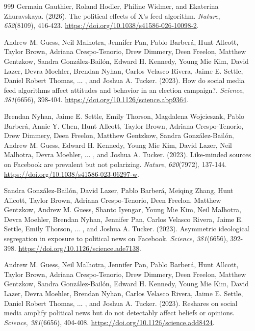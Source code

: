 \documentclass[10pt,a4paper]{article}
\begin{document}
\begin{thebibliography}{999}
Germain Gauthier, Roland Hodler, Philine Widmer, and Ekaterina Zhuravskaya. (2026). The political effects of X's feed algorithm. \textit{Nature}, \textit{652}(8109), 416-423. \url{https://doi.org/10.1038/s41586-026-10098-2}.

Andrew M. Guess, Neil Malhotra, Jennifer Pan, Pablo Barber\'{a}, Hunt Allcott, Taylor Brown, Adriana Crespo-Tenorio, Drew Dimmery, Deen Freelon, Matthew Gentzkow, Sandra Gonz\'{a}lez-Bail\'{o}n, Edward H. Kennedy, Young Mie Kim, David Lazer, Devra Moehler, Brendan Nyhan, Carlos Velasco Rivera, Jaime E. Settle, Daniel Robert Thomas, ... , and Joshua A. Tucker. (2023). How do social media feed algorithms affect attitudes and behavior in an election campaign?. \textit{Science}, \textit{381}(6656), 398-404. \url{https://doi.org/10.1126/science.abp9364}.

Brendan Nyhan, Jaime E. Settle, Emily Thorson, Magdalena Wojcieszak, Pablo Barber\'{a}, Annie Y. Chen, Hunt Allcott, Taylor Brown, Adriana Crespo-Tenorio, Drew Dimmery, Deen Freelon, Matthew Gentzkow, Sandra Gonz\'{a}lez-Bail\'{o}n, Andrew M. Guess, Edward H. Kennedy, Young Mie Kim, David Lazer, Neil Malhotra, Devra Moehler, ... , and Joshua A. Tucker. (2023). Like-minded sources on Facebook are prevalent but not polarizing. \textit{Nature}, \textit{620}(7972), 137-144. \url{https://doi.org/10.1038/s41586-023-06297-w}.

Sandra Gonz\'{a}lez-Bail\'{o}n, David Lazer, Pablo Barber\'{a}, Meiqing Zhang, Hunt Allcott, Taylor Brown, Adriana Crespo-Tenorio, Deen Freelon, Matthew Gentzkow, Andrew M. Guess, Shanto Iyengar, Young Mie Kim, Neil Malhotra, Devra Moehler, Brendan Nyhan, Jennifer Pan, Carlos Velasco Rivera, Jaime E. Settle, Emily Thorson, ... , and Joshua A. Tucker. (2023). Asymmetric ideological segregation in exposure to political news on Facebook. \textit{Science}, \textit{381}(6656), 392-398. \url{https://doi.org/10.1126/science.ade7138}.

Andrew M. Guess, Neil Malhotra, Jennifer Pan, Pablo Barber\'{a}, Hunt Allcott, Taylor Brown, Adriana Crespo-Tenorio, Drew Dimmery, Deen Freelon, Matthew Gentzkow, Sandra Gonz\'{a}lez-Bail\'{o}n, Edward H. Kennedy, Young Mie Kim, David Lazer, Devra Moehler, Brendan Nyhan, Carlos Velasco Rivera, Jaime E. Settle, Daniel Robert Thomas, ... , and Joshua A. Tucker. (2023). Reshares on social media amplify political news but do not detectably affect beliefs or opinions. \textit{Science}, \textit{381}(6656), 404-408. \url{https://doi.org/10.1126/science.add8424}.


\end{thebibliography}
\end{document}
